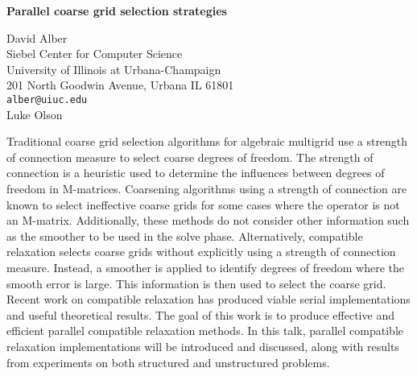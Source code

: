 \documentclass{report}
\begin{document}


\begin{center}
{\large
{\bf Parallel coarse grid selection strategies}}

	David Alber \\
	Siebel Center for Computer Science \\
	University of Illinois at Urbana-Champaign \\
	201 North Goodwin Avenue, Urbana IL 61801 \\
	{\tt alber@uiuc.edu} \\
	Luke Olson
\end{center}
Traditional coarse grid selection algorithms for algebraic
multigrid use a strength of connection measure to select
coarse degrees of freedom. The strength of connection is a
heuristic used to determine the influences between degrees
of freedom in M-matrices. Coarsening algorithms using a
strength of connection are known to select ineffective
coarse grids for some cases where the operator is not an
M-matrix. Additionally, these methods do not consider other
information such as the smoother to be used in the solve
phase. Alternatively, compatible relaxation selects coarse
grids without explicitly using a strength of connection
measure. Instead, a smoother is applied to identify degrees
of freedom where the smooth error is large. This information
is then used to select the coarse grid. Recent work on
compatible relaxation has produced viable serial
implementations and useful theoretical results. The goal of
this work is to produce effective and efficient parallel
compatible relaxation methods. In this talk, parallel
compatible relaxation implementations will be introduced and
discussed, along with results from experiments on both
structured and unstructured problems.



\end{document}
